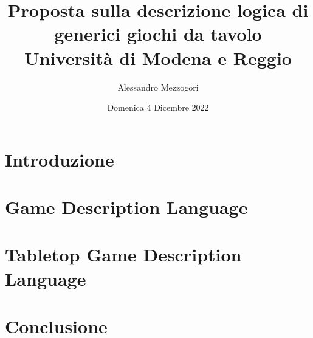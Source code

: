 \documentclass[12pt, oneside]{report}
\title{
    {Proposta sulla descrizione logica  di generici giochi da tavolo} \\
    {\large Università di Modena e Reggio} \\
}
\author{Alessandro Mezzogori}
\date{Domenica 4 Dicembre 2022}
\newcommand{\blankpage}{
    \null
    \thispagestyle{empty}
    \addtocounter{page}{-1}
    \newpage
}
\begin{document}
\maketitle
\blankpage
\tableofcontents

\chapter{Introduzione}


\chapter{Game Description Language}


\chapter{Tabletop Game Description Language}


\chapter{Conclusione}


\printbibliography
\end{document}

